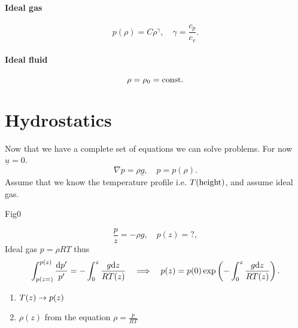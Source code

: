 \documentclass[11pt,oneside]{book}
\renewcommand{\vec}[1]{\underline{#1}}
\theoremstyle{definition} %
\theoremstyle{plain} %
\theoremstyle{remark} %
\theoremstyle{underline}
\begin{document}
  \paragraph{Ideal gas}
  \begin{displaymath}
    p(\rho) = C \rho ^\gamma, \quad \gamma = \frac{c_p}{c_v}.
  \end{displaymath}

  \paragraph{Ideal fluid}
  \begin{displaymath}
    \rho = \rho_0 = \textrm{const}.
  \end{displaymath}

  \section{Hydrostatics}
  Now that we have a complete set of equations we can solve problems.
  For now $\vec u = 0$.
  \begin{displaymath}
    \nabla p = \rho \vec g, \quad p = p(\rho).
  \end{displaymath}
  Assume that we know the temperature profile i.e. $T(\textrm{height})$, and assume ideal gas.
  
  \todo Fig0
  
  \begin{displaymath}
    \dfrac{p}{z} = - \rho g, \quad p(z) = ?,
  \end{displaymath}
  Ideal gas $p = \rho R T$ thus 
  \begin{displaymath}
    \int_{p(z = )}^{p(z)} \frac{\mathrm{d} p'}{p'} = - \int_0^z \frac{g \mathrm{d} z}{RT(z)} 
    \quad \Longrightarrow \quad p(z) = p(0) \exp\left( -\int_0^z \frac{g \mathrm{d} z}{RT(z)} \right).
  \end{displaymath}

  \begin{enumerate}
    \item $T(z) \rightarrow p(z)$
    \item $\rho(z)$ from the equation $\rho=  \frac{p}{RT}$
  \end{enumerate}
\end{document}
